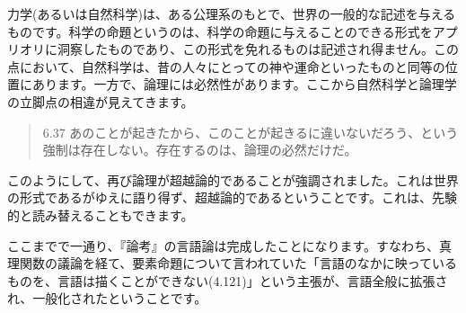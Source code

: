\documentclass[12pt]{jsarticle}
\begin{document}
力学(あるいは自然科学)は、ある公理系のもとで、世界の一般的な記述を与えるものです。科学の命題というのは、科学の命題に与えることのできる形式をアプリオリに洞察したものであり、この形式を免れるものは記述され得ません。この点において、自然科学は、昔の人々にとっての神や運命といったものと同等の位置にあります。一方で、論理には必然性があります。ここから自然科学と論理学の立脚点の相違が見えてきます。
\begin{quote}
6.37 あのことが起きたから、このことが起きるに違いないだろう、という強制は存在しない。存在するのは、論理の必然だけだ。
\end{quote}
\par
このようにして、再び論理が超越論的であることが強調されました。これは世界の形式であるがゆえに語り得ず、超越論的であるということです。これは、先験的と読み替えることもできます。\par
ここまでで一通り、『論考』の言語論は完成したことになります。すなわち、真理関数の議論を経て、要素命題について言われていた「言語のなかに映っているものを、言語は描くことができない(4.121)」という主張が、言語全般に拡張され、一般化されたということです。
\end{document}
